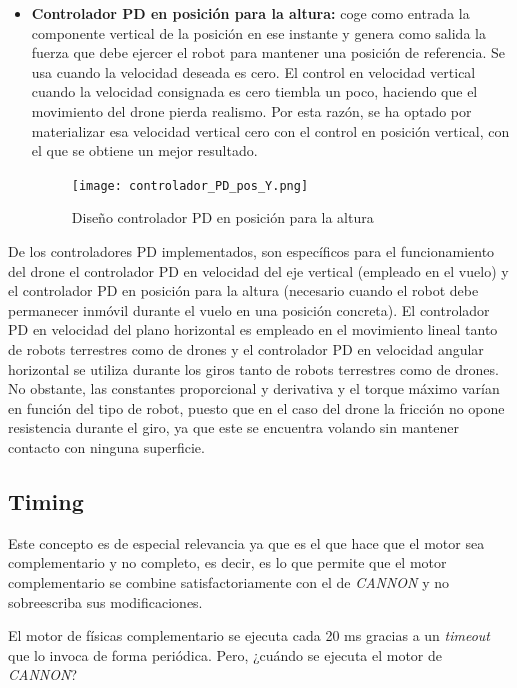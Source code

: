 \begin{itemize}
    \item \textbf{Controlador PD en posición para la altura:} coge como entrada la componente vertical de la posición en ese instante y genera como salida la fuerza que debe ejercer el robot para mantener una posición de referencia. Se usa cuando la velocidad deseada es cero. El control en velocidad vertical cuando la velocidad consignada es cero tiembla un poco, haciendo que el movimiento del drone pierda realismo. Por esta razón, se ha optado por materializar esa velocidad vertical cero con el control en posición vertical, con el que se obtiene un mejor resultado.
    
    \clearpage
    \begin{figure}[h!]
    \centering
    \texttt{[image: controlador\_PD\_pos\_Y.png]}
    \caption[Diseño controlador PD en posición para la altura]{Diseño controlador PD en posición para la altura\footnotemark}
    \label{fig:esquema_pd_5}
    \end{figure}
\end{itemize}

De los controladores PD implementados, son específicos para el funcionamiento del drone el controlador PD en velocidad del eje vertical (empleado en el vuelo) y el controlador PD en posición para la altura (necesario cuando el robot debe permanecer inmóvil durante el vuelo en una posición concreta). El controlador PD en velocidad del plano horizontal es empleado en el movimiento lineal tanto de robots terrestres como de drones y el controlador PD en velocidad angular horizontal se utiliza durante los giros tanto de robots terrestres como de drones. No obstante, las constantes proporcional y derivativa y el torque máximo varían en función del tipo de robot, puesto que en el caso del drone la fricción no opone resistencia durante el giro, ya que este se encuentra volando sin mantener contacto con ninguna superficie.
    
\normalsize
\subsection{Timing}
Este concepto es de especial relevancia ya que es el que hace que el motor sea complementario y no completo, es decir, es lo que permite que el motor complementario se combine satisfactoriamente con el de \textit{CANNON} y no sobreescriba sus modificaciones. \newline

El motor de físicas complementario se ejecuta cada 20 ms gracias a un \textit{timeout} que lo invoca de forma periódica. Pero, ¿cuándo se ejecuta el motor de \textit{CANNON}? 

